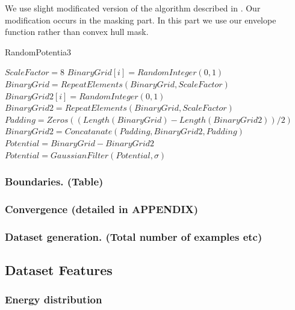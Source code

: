 \documentclass[a4paper,times,12pt]{article}
\begin{document}
We use slight modificated version of the algorithm described in \cite{mills2017deep}. Our modification occurs in the masking part. In this part we use our envelope function rather than convex hull mask. 


\begin{algorithm}[H]
    \caption{RandomPotentia3}\label{euclid}
    \begin{algorithmic}[1]
        \State $ ScaleFactor = 8$
        \State $BinaryGrid[i] = RandomInteger(0, 1)$
        \EndFor
        \State $BinaryGrid = RepeatElements(BinaryGrid, ScaleFactor)$
        \State $BinaryGrid2[i] = RandomInteger(0, 1)$
        \EndFor
        \State $BinaryGrid2 = RepeatElements(BinaryGrid, ScaleFactor)$
        \State $Padding = Zeros((Length(BinaryGrid) - Length(BinaryGrid2))/2)$
        \State $BinaryGrid2 = Concatanate(Padding, BinaryGrid2, Padding) $
        \State $Potential = BinaryGrid - BinaryGrid2$
        \State $Potential = GaussianFilter(Potential, \sigma)$ 
    \EndProcedure
    \end{algorithmic}
\label{alg:random_potential_1}
\end{algorithm}




\subsubsection{Boundaries. (Table)}
\subsubsection{Convergence (detailed in APPENDIX)}
\subsubsection{Dataset generation. (Total number of examples etc)}

\subsection{Dataset Features}
\subsubsection{Energy distribution}

\end{document}
